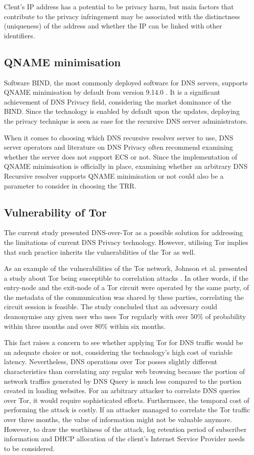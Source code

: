 Clent's IP address has a potential to be privacy harm, but main factors that contribute to the privacy infringement may be associated with the distinctness (uniqueness) of the address and whether the IP can be linked with other identifiers.

\subsection{QNAME minimisation}
Software BIND, the most commonly deployed software for DNS servers, supports QNAME minimisation by default from version 9.14.0 \cite{bind9qname}.
It is a significant achievement of DNS Privacy field, considering the market dominance of the BIND. Since the technology is enabled by default upon the updates, deploying the privacy technique is seen as ease for the recursive DNS server administrators.

When it comes to choosing which DNS recursive resolver server to use, DNS server operators and literature on DNS Privacy often recommend examining whether the server does not support ECS or not. Since the implementation of QNAME minimisation is officially in place, examining whether an arbitrary DNS Recursive resolver supports QNAME minimisation or not could also be a parameter to consider in choosing the TRR.

\subsection{Vulnerability of Tor}
The current study presented DNS-over-Tor as a possible solution for addressing the limitations of current DNS Privacy technology. However, utilising Tor implies that such practice inherits the vulnerabilities of the Tor as well. 

As an example of the vulnerabilities of the Tor network, Johnson et al. presented a study about Tor being susceptible to correlation attacks \cite{Johnson2013}.
In other words, if the entry-node and the exit-node of a Tor circuit were operated by the same party, of the metadata of the communication was shared by these parties, correlating the circuit session is feasible.
The study concluded that an adversary could deanonymise any given user who uses Tor regularly with over 50\% of probability within three months and over 80\% within six months.

This fact raises a concern to see whether applying Tor for DNS traffic would be an adequate choice or not, considering the technology's high cost of variable latency.
Nevertheless, DNS operations over Tor posses slightly different characteristics than correlating any regular web browsing because the portion of network traffics generated by DNS Query is much less compared to the portion created in loading websites.
For an arbitrary attacker to correlate DNS queries over Tor, it would require sophisticated efforts. Furthermore, the temporal cost of performing the attack is costly.
If an attacker managed to correlate the Tor traffic over three months, the value of information might not be valuable anymore.
However, to draw the worthiness of the attack, log retention period of subscriber information and DHCP allocation of the client's Internet Service Provider needs to be considered.